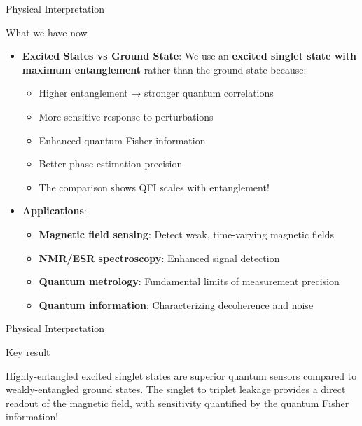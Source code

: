 \documentclass{beamer}
\begin{document}
\begin{frame}{Physical Interpretation}

\begin{alertblock}{What we have now}
\begin{itemize}
\item \textbf{Excited States vs Ground State}: We use an \textbf{excited singlet state with maximum entanglement} rather than the ground state because:
\begin{itemize}
\item Higher entanglement → stronger quantum correlations
\item More sensitive response to perturbations
\item Enhanced quantum Fisher information
\item Better phase estimation precision
\item The comparison shows QFI scales with entanglement!
\end{itemize}
\item  \textbf{Applications}:
\begin{itemize}
\item \textbf{Magnetic field sensing}: Detect weak, time-varying magnetic fields
\item \textbf{NMR/ESR spectroscopy}: Enhanced signal detection
\item \textbf{Quantum metrology}: Fundamental limits of measurement precision
\item \textbf{Quantum information}: Characterizing decoherence and noise
\end{itemize}
\end{itemize}
\end{alertblock}
\end{frame}

\begin{frame}{Physical Interpretation}
\begin{alertblock}{Key result}

Highly-entangled excited singlet states are superior quantum sensors
compared to weakly-entangled ground states. The singlet to triplet
leakage provides a direct readout of the magnetic field, with
sensitivity quantified by the quantum Fisher information!
\end{alertblock}
\end{frame}
\end{document}
